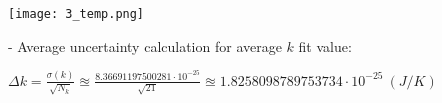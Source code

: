 \documentclass[10pt,letterpaper,onecolumn]{article}
\begin{document}
  \begin{center}
 \texttt{[image: 3\_temp.png]}
 \label{fig:3_temp}
 \end{center}

\vspace{20pt}

- Average uncertainty calculation for average $k$ fit value:
 \begin{center}
    $\Delta k = \frac{\sigma(k)}{\sqrt{N_k}} \approxeq \frac{8.36691197500281\cdot 10^{-25}}{\sqrt{21}} \approxeq 1.8258098789753734\cdot 10^{-25}\ (J/K)$
\end{center}
\end{document}
